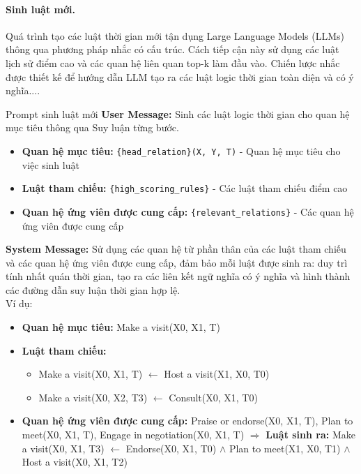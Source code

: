 \paragraph{Sinh luật mới.}
Quá trình tạo các luật thời gian mới tận dụng Large Language Models (LLMs) thông qua phương pháp nhắc có cấu trúc. Cách tiếp cận này sử dụng các luật lịch sử điểm cao và các quan hệ liên quan top-k làm đầu vào. Chiến lược nhắc được thiết kế để hướng dẫn LLM tạo ra các luật logic thời gian toàn diện và có ý nghĩa....
\begin{promptbox}{Prompt sinh luật mới}
\textbf{User Message:}
Sinh các luật logic thời gian cho quan hệ mục tiêu thông qua Suy luận từng bước.
\begin{itemize}
    \item \textbf{Quan hệ mục tiêu:} \texttt{\{head\_relation\}(X, Y, T)} - Quan hệ mục tiêu cho việc sinh luật
    \item \textbf{Luật tham chiếu:} \texttt{\{high\_scoring\_rules\}} - Các luật tham chiếu điểm cao
    \item \textbf{Quan hệ ứng viên được cung cấp:} \texttt{\{relevant\_relations\}} - Các quan hệ ứng viên được cung cấp
\end{itemize}

\textbf{System Message:} Sử dụng các quan hệ từ phần thân của các luật tham chiếu và các quan hệ ứng viên được cung cấp, đảm bảo mỗi luật được sinh ra: duy trì tính nhất quán thời gian, tạo ra các liên kết ngữ nghĩa có ý nghĩa và hình thành các đường dẫn suy luận thời gian hợp lệ.\\
Ví dụ:

\begin{itemize}
    \item \textbf{Quan hệ mục tiêu:} Make a visit(X0, X1, T)
    \item \textbf{Luật tham chiếu:}
    \begin{itemize}
        \item Make a visit(X0, X1, T) $\leftarrow$ Host a visit(X1, X0, T0)
        \item Make a visit(X0, X2, T3) $\leftarrow$ Consult(X0, X1, T0)
    \end{itemize}
    \item \textbf{Quan hệ ứng viên được cung cấp:} Praise or endorse(X0, X1, T), Plan to meet(X0, X1, T), Engage in negotiation(X0, X1, T)
    $\Rightarrow$ \textbf{Luật sinh ra:} Make a visit(X0, X1, T3) $\leftarrow$ Endorse(X0, X1, T0) $\land$ Plan to meet(X1, X0, T1) $\land$ Host a visit(X0, X1, T2)
\end{itemize}
\end{promptbox}


